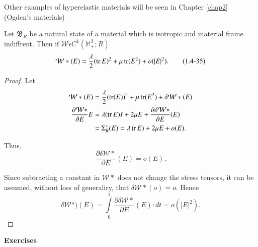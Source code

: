 \begin{remark}\label{chap1-rem1.4.5}%
  Other examples of hyperelastic materials will be seen in Chapter
  \ref{chap2} (Ogden's materials) 
\end{remark}

\begin{theorem}\label{chap1-thm1.4.8}%
  Let $\mathfrak{B}_R$ be a natural state of a material which is
  isotro\-pic and material frame indiffrent. Then if $\mathcal{W}
  \epsilon C^1 (\mathbb{M}^3_+; R)$  
  \begin{equation*}
    \mathcal{W} * (E) = \frac{\lambda}{2} (\operatorname{tr} E)^2 + \mu \operatorname{tr} (E^2) + o
    (|E|^2).\tag{1.4-35} \label{eq1.4-35}
  \end{equation*}
\end{theorem}

\begin{proof}
Let
  \begin{align*}
    \mathcal{W}* (E) &= \frac{\lambda}{2} (\operatorname{tr} (E))^2 + \mu \operatorname{tr} (E^2) +
    \delta \mathcal{W} * (E)\\ 
    \frac{\partial \mathcal{W}*}{\partial E} {E} &= \lambda (\operatorname{tr} E)I + 2\mu
    E + \frac{\partial \delta \mathcal{W} *} {\partial E}(E)\\ 
    &= \Sigma^*_R (E) = \lambda \operatorname{tr} E) + 2\mu E + o(E).
  \end{align*}

Thus,
$$
\frac{\partial \delta \mathcal{W}*}{\partial E} (E) = o(E).
$$

Since subtracting a constant in $\mathcal{W}*$ does not change the
stress tensors, it can be assumed, without loss of generaliry, that
$\delta \mathcal{W}*(o)=o$. Hence  
$$
\delta \mathcal{W}*)(E)=\int \limits_{0}^{1} \frac{\partial \delta
  \mathcal{W}*}{\partial E} (E): dt = o(|E|^2). 
$$
\end{proof}

\medskip
\begin{center} 
{\large\bf Exercises}\pageoriginale
\end{center}

